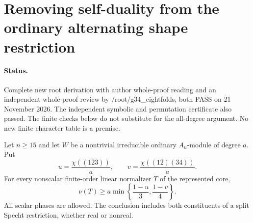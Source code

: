 \section{Removing self-duality from the ordinary alternating shape restriction}
\label{sec:ordinary-alternating-sharp}

\paragraph{Status.}
Complete new root derivation with author whole-proof reading and an
independent whole-proof review by /root/g34\_eightfolds, both PASS
on 21 November 2026. The independent symbolic and permutation
certificate also passed. The finite checks below do not substitute
for the all-degree argument. No new finite character table is a premise.

\begin{lemma}
\label{HD-ALT-03a}
Let $n\ge15$ and let $W$ be a nontrivial irreducible ordinary
$A_n$-module of degree $a$. Put
\[
 u=\frac{\chi((123))}{a},\qquad
 v=\frac{\chi((12)(34))}{a}.
\]
For every nonscalar finite-order linear normalizer $T$ of the
represented core,
\[
 \nu(T)\ge a\min\left\{\frac{1-u}{3},\frac{1-v}{4}\right\}.
                                                               \tag{ALTN.1}
\]
All scalar phases are allowed. The conclusion includes both
constituents of a split Specht restriction, whether real or nonreal.
\end{lemma}

